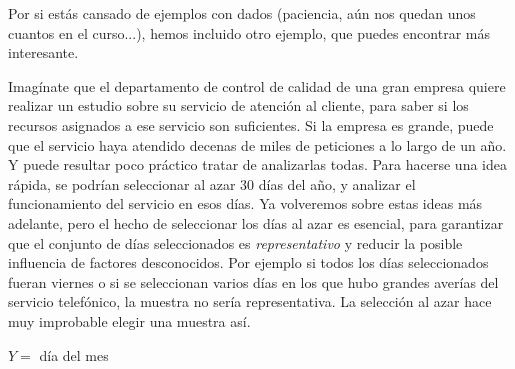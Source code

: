 \noindent Por si estás cansado de ejemplos con dados (paciencia, aún nos quedan unos cuantos en el curso...), hemos incluido otro ejemplo, que puedes encontrar más interesante.
\begin{ejemplo}
\label{cap04:ejem:vectorAleatorioDias2014}
Imagínate que el departamento de control de calidad de una gran empresa quiere realizar un estudio sobre su servicio de atención al cliente, para saber si los recursos asignados a ese servicio son suficientes. Si la empresa es grande, puede que el servicio haya atendido decenas de miles de peticiones a lo largo de un año. Y puede resultar poco práctico tratar de analizarlas todas. Para hacerse una idea rápida, se podrían seleccionar  al azar $30$ días del año, y analizar el funcionamiento del servicio en esos días. Ya volveremos sobre estas ideas más adelante, pero el hecho de seleccionar los días al azar es esencial, para garantizar que el conjunto de días seleccionados  es {\em representativo} y reducir la posible influencia de factores desconocidos. Por ejemplo si todos los días seleccionados fueran viernes o si se seleccionan varios días en los que hubo grandes averías del servicio telefónico, la muestra no sería representativa. La selección al azar hace muy improbable elegir una muestra así.

\begin{table}[p]
\centering
$Y=$ día del mes
\begin{tabular}{|r|r|r|r|r|r|r|r|}


\end{tabular}
\end{table}
\end{ejemplo}
